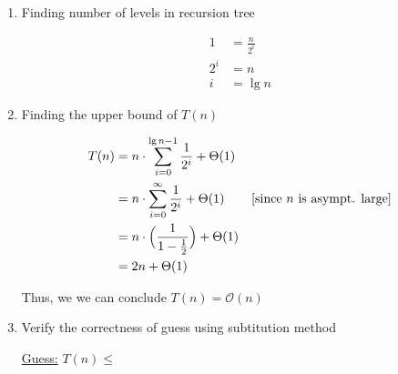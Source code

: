 \documentclass[12pt]{article}
\begin{document}
\begin{enumerate}[1.]
    \begin{enumerate}[1.]
        \item Finding number of levels in recursion tree

        \begin{align}
            1 &= \frac{n}{2^i}\\
            2^i &= n\\
            i &= \lg n
        \end{align}


        \item Finding the upper bound of $T(n)$

        \begin{align}
            T(n) &= n \cdot \sum\limits_{i=0}^{\lg n - 1} \frac{1}{2^i} + \Theta(1)\\
            &= n \cdot \sum\limits_{i=0}^{\infty} \frac{1}{2^i} + \Theta(1) & [\text{since $n$ is asympt. large}]\\
            &= n \cdot \Bigl ( \frac{1}{1 - \frac{1}{2}} \Bigr) + \Theta(1)\\
            &= 2n + \Theta(1)\\
        \end{align}

        \bigskip

        Thus, we we can conclude $T(n) = \mathcal{O}(n)$

        \bigskip


        \item Verify the correctness of guess using subtitution method

        \bigskip

        \underline{Guess:} $T(n) \leq $


    \end{enumerate}

\end{enumerate}
\end{document}
